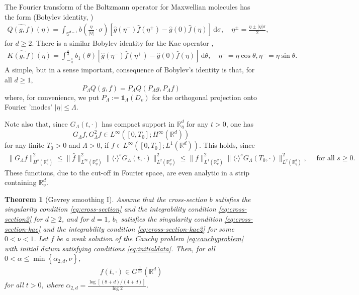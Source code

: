 \documentclass[11pt,a4paper,reqno]{amsart}
\theoremstyle{plain}
\newtheorem{theorem}[proposition]{Theorem}
\theoremstyle{definition}
\begin{document}
The Fourier transform of the Boltzmann operator for Maxwellian molecules has the form (Bobylev identity, \cite{Bob84})
\begin{align}\label{eq:bobylev}
	\widehat{Q(g,f)}(\eta) = \int_{{\mathbb{S}}^{d-1}} b\left(\frac{\eta}{|\eta|}\cdot\sigma\right) \left[ \hat{g}(\eta^-) \hat{f}(\eta^+) - \hat{g}(0) \hat{f}(\eta) \right] \, \mathrm{d}\sigma, \quad \eta^{\pm} = \frac{\eta\pm |\eta| \sigma}{2},
\end{align}
for $d\geq 2$. There is a similar Bobylev identity for the Kac operator \cite{Des95},
\begin{align}
	\widehat{K(g,f)}(\eta) = \int_{-\frac{\pi}{4}}^{\frac{\pi}{4}} b_1(\theta) \left[ \hat{g}(\eta^-)\hat{f}(\eta^+) - \hat{g}(0) \hat{f}(\eta)\right] \,\mathrm{d}\theta, \quad \eta^+ = \eta \cos\theta, \eta^- = \eta \sin\theta.
\end{align}
A simple, but in a sense important, consequence of Bobylev's identity is that, for all $d\geq 1$,
\begin{equation}\label{eq:quasilocal}
	P_\Lambda Q(g,f) = P_\Lambda Q(P_\Lambda g, P_\Lambda f)
\end{equation}
where, for convenience, we put $P_\Lambda:= {\mathds{1}}_\Lambda(D_v)$ for the orthogonal projection onto Fourier 'modes' $|\eta|\le \Lambda$.

Note also that, since $G_{\Lambda}(t,\cdot)$ has compact support in ${\mathbb{R}}^d_{\eta}$ for any $t>0$, one has
\[G_{\Lambda}f, G_{\Lambda}^2 f \in L^{\infty}([0,T_0]; H^{\infty}({\mathbb{R}}^d))\]
for any finite $T_0>0$ and $\Lambda>0$, if $f\in L^{\infty}([0,T_0];L^1({\mathbb{R}}^d))$. This holds, since
\begin{align*}
\|G_{\Lambda} f \|_{H^s({\mathbb{R}}^d_v)}^2 \leq \| \hat{f} \|_{L^{\infty}({\mathbb{R}}^d_{\eta})}^2 \| \langle \cdot \rangle^s G_{\Lambda}(t, \cdot)\|_{L^2({\mathbb{R}}^d_{\eta})}^2 \leq \| f \|_{L^1({\mathbb{R}}^d_v)}^2 \| \langle\cdot\rangle^{s} G_{\Lambda}(T_0, \cdot) \|_{L^2({\mathbb{R}}^d_{\eta})}^2, \quad \text{ for all } s\geq 0.
\end{align*}
These functions, due to the cut-off in Fourier space, are even analytic in a strip containing ${\mathbb{R}}^d_v$.

\begin{theorem}[Gevrey smoothing I]\label{thm:gevrey-main1}
		Assume that the cross-section $b$ satisfies the \emph{singularity condition} \eqref{eq:cross-section} and the \emph{integrability condition} \eqref{eq:cross-section2} for $d\geq 2$, and for $d=1$, $b_1$ satisfies the \emph{singularity condition} \eqref{eq:cross-section-kac} and the \emph{integrability condition} \eqref{eq:cross-section-kac2} for some $0<\nu<1$. Let $f$ be a weak solution of the Cauchy problem \eqref{eq:cauchyproblem} with initial datum satisfying conditions \eqref{eq:initialdata}. Then, for all $0<\alpha\leq \min\left\{\alpha_{2,d}, \nu\right\}$,
	\begin{align}
		f(t,\cdot)\in G^{\tfrac{1}{2\alpha}}({\mathbb{R}}^d)
	\end{align}
	for all $t>0$, where $\alpha_{2,d} = \frac{\log[(8+d)/(4+d)]}{\log 2}$. 
\end{theorem}
\end{document}
